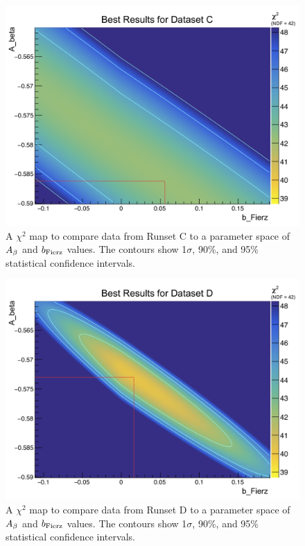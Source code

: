 \begin{figure}[h!tb]
	\centering
	\includegraphics[width=.999\linewidth]
	{Figures/Chi2_2D_SetC.png}
	\caption[$\chi^2$ Map for Runset C]{A $\chi^2$ map to compare data from Runset C to a parameter space of $A_{\beta}$ and $b_{\mathrm{Fierz}}$ values.  The contours show 1$\sigma$, 90\%, and 95\% statistical confidence intervals.}	
	\label{fig:2dchi2_setC}
\end{figure}
%
\begin{figure}[h!tb]
	\centering
	\includegraphics[width=.999\linewidth]
	{Figures/Chi2_2D_SetD.png}
	\caption[$\chi^2$ Map for Runset D]{A $\chi^2$ map to compare data from Runset D to a parameter space of $A_{\beta}$ and $b_{\mathrm{Fierz}}$ values.  The contours show 1$\sigma$, 90\%, and 95\% statistical confidence intervals.}	
	\label{fig:2dchi2_setD}
\end{figure}



